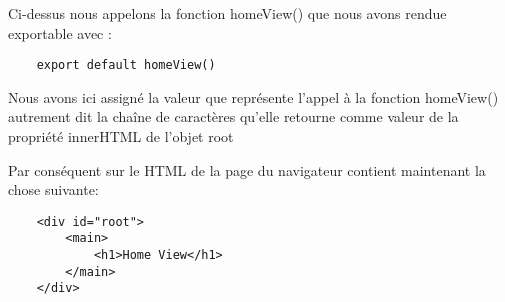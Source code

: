 \documentclass[a4paper, 12pt]{report}
\begin{document}
Ci-dessus nous appelons la fonction homeView() que nous avons rendue exportable avec :
\begin{verbatim}
    export default homeView()
\end{verbatim}

Nous avons ici assigné la valeur que représente l'appel à la fonction homeView() autrement dit la chaîne de caractères qu'elle retourne comme valeur de la propriété innerHTML de l'objet root

Par conséquent sur le HTML de la page du navigateur contient maintenant la chose suivante:

\begin{verbatim}
    <div id="root">
        <main>
            <h1>Home View</h1>
        </main>
    </div>
\end{verbatim}
\end{document}
